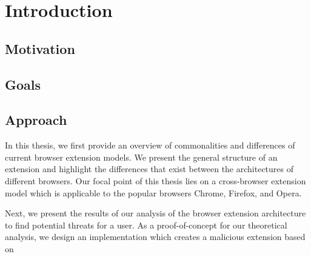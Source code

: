 \chapter{Introduction}

\section{Motivation}
\section{Goals}


\section{Approach}
	
	In this thesis, we first provide an overview of commonalities and differences of current browser extension models. We present the general structure of an extension and highlight the differences that exist between the architectures of different browsers. Our focal point of this thesis lies on a cross-browser extension model which is applicable to the popular browsers Chrome, Firefox, and Opera. 
	
	Next, we present the results of our analysis of the browser extension architecture to find potential threats for a user. As a proof-of-concept for our theoretical analysis, we design an implementation which creates a malicious extension based on 